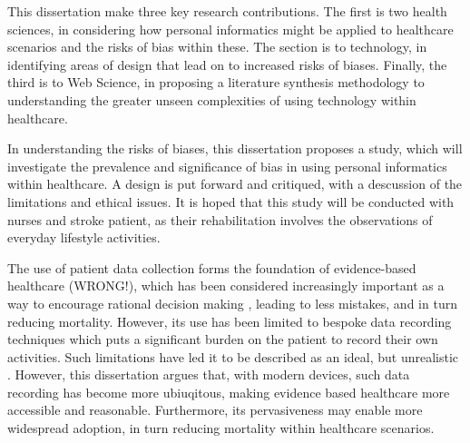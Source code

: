   This dissertation make three key research contributions. The first is two health sciences, in considering how personal informatics might be applied to healthcare scenarios and the risks of bias within these. The section is to technology, in identifying areas of design that lead on to increased risks of biases. Finally, the third is to Web Science, in proposing a literature synthesis methodology to understanding the greater unseen complexities of using technology within healthcare.

  In understanding the risks of biases, this dissertation proposes a study, which will investigate the prevalence and significance of bias in using personal informatics within healthcare. A design is put forward and critiqued, with a descussion of the limitations and ethical issues. It is hoped that this study will be conducted with nurses and stroke patient, as their rehabilitation involves the observations of everyday lifestyle activities.


The use of patient data collection forms the foundation of evidence-based healthcare (WRONG!), which has been considered increasingly important as a way to encourage rational decision making \citep{Heneghan2013}, leading to less mistakes, and in turn reducing mortality. However, its use has been limited to bespoke data recording techniques which puts a significant burden on the patient to record their own activities. Such limitations have led it to be described as an ideal, but unrealistic \citep{Heneghan2013}. However, this dissertation argues that, with modern devices, such data recording has become more ubiuqitous, making evidence based healthcare more accessible and reasonable. Furthermore, its pervasiveness may enable more widespread adoption, in turn reducing mortality within healthcare scenarios.



